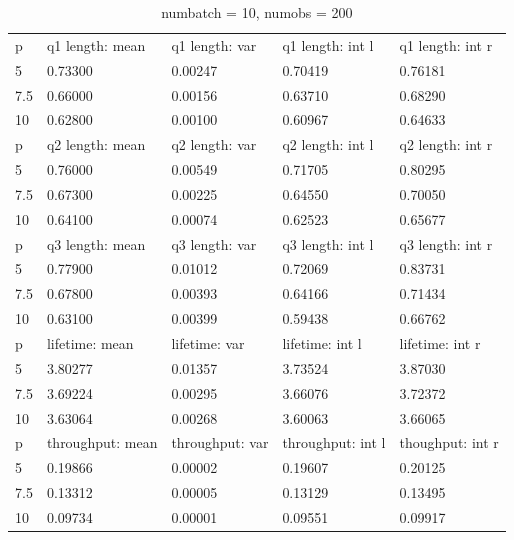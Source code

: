 \documentclass[a4paper,11pt]{article}
\begin{document}
\begin{table}[H]
\begin{tabular}{lllll}
    \rowcolor{LightPurple}
    p & q1 length: mean & q1 length: var & q1 length: int l & q1 length: int r \\
    \rowcolor{Gray}
    5 & 0.73300 & 0.00247 & 0.70419 & 0.76181 \\
    7.5 & 0.66000 & 0.00156 & 0.63710 & 0.68290 \\
    \rowcolor{LightCyan}
    10 & 0.62800 & 0.00100 & 0.60967 & 0.64633  \\
    
    \rowcolor{LightPurple}
    p & q2 length: mean & q2 length: var & q2 length: int l & q2 length: int r \\
    \rowcolor{Gray}
    5 & 0.76000 & 0.00549 & 0.71705 & 0.80295 \\
    7.5 & 0.67300 & 0.00225 & 0.64550 & 0.70050 \\
    \rowcolor{LightCyan}
    10 & 0.64100 & 0.00074 & 0.62523 & 0.65677 \\
    
    \rowcolor{LightPurple}
    p & q3 length: mean & q3 length: var & q3 length: int l & q3 length: int r \\
    \rowcolor{Gray}
    5 & 0.77900 & 0.01012 & 0.72069 & 0.83731  \\
    7.5 & 0.67800 & 0.00393 & 0.64166 & 0.71434 \\
    \rowcolor{LightCyan}
    10 & 0.63100 & 0.00399 & 0.59438 & 0.66762 \\
    
    \rowcolor{LightPurple}
    p & lifetime: mean & lifetime: var & lifetime: int l & lifetime: int r \\
    \rowcolor{Gray}
    5 & 3.80277 & 0.01357 & 3.73524 & 3.87030  \\
    7.5 & 3.69224 & 0.00295 & 3.66076 & 3.72372 \\
    \rowcolor{LightCyan}
    10 & 3.63064 & 0.00268 & 3.60063 & 3.66065 \\
    
    \rowcolor{LightPurple}
    p & throughput: mean & throughput: var & throughput: int l & thoughput: int r \\ 
    \rowcolor{Gray}
    5 & 0.19866 & 0.00002 & 0.19607 & 0.20125 \\
    7.5 & 0.13312 & 0.00005 & 0.13129 & 0.13495 \\
    \rowcolor{LightCyan}
    10 & 0.09734 & 0.00001 & 0.09551 & 0.09917 \\
    
\end{tabular}
\caption{numbatch = 10, numobs = 200} \label{tab:tab1}
\end{table}
\end{document}
